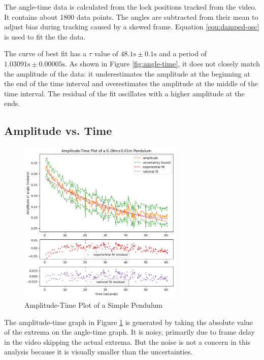 \documentclass[12pt]{article}
\begin{document}
The angle-time data is calculated from the lock positions tracked from the video. It contains about 1800 data points. The angles are subtracted from their mean to adjust bias during tracking caused by a skewed frame. Equation \ref{equ:damped-osc} is used to fit the the data.

The curve of best fit has a $\tau$ value of $48.1\mathrm{s}\pm0.1\mathrm{s}$ and a period of $1.03091\mathrm{s}\pm0.00005\mathrm{s}$. As shown in Figure \ref{fig:angle-time}, it does not closely match the amplitude of the data: it underestimates the amplitude at the beginning at the end of the time interval and overestimates the amplitude at the middle of the time interval. The residual of the fit oscillates with a higher amplitude at the ends.

\subsection{Amplitude vs. Time}

\begin{figure}[!ht]
\begin{center}
\includegraphics[width=0.7\textwidth]{amplitude-time.png}
\end{center}
\caption{Amplitude-Time Plot of a Simple Pendulum}
\label{fig:amplitude-time}
\end{figure}

The amplitude-time graph in Figure \ref{fig:amplitude-time} is generated by taking the absolute value of the extrema on the angle-time graph. It is noisy, primarily due to frame delay in the video skipping the actual extrema. But the noise is not a concern in this analysis because it is visually smaller than the uncertainties.
\end{document}
